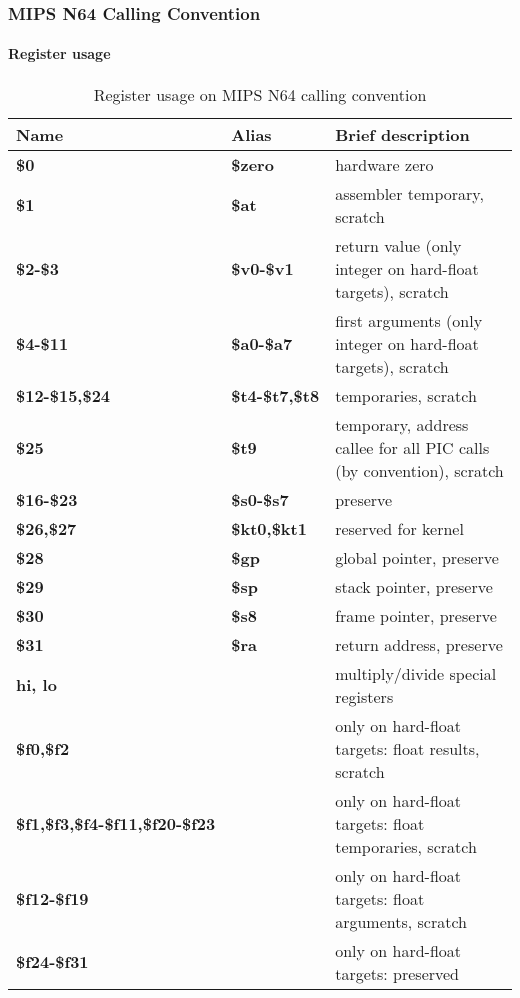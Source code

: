 \subsubsection{MIPS N64 Calling Convention}

\paragraph{Register usage}

\begin{table}[h]
\begin{tabular*}{0.95\textwidth}{lll}
Name                                   & Alias                & Brief description\\
\hline
{\bf \$0}                              & {\bf \$zero}         & hardware zero \\
{\bf \$1}                              & {\bf \$at}           & assembler temporary, scratch \\
{\bf \$2-\$3}                          & {\bf \$v0-\$v1}      & return value (only integer on hard-float targets), scratch \\
{\bf \$4-\$11}                         & {\bf \$a0-\$a7}      & first arguments (only integer on hard-float targets), scratch \\
{\bf \$12-\$15,\$24}                   & {\bf \$t4-\$t7,\$t8} & temporaries, scratch \\
{\bf \$25}                             & {\bf \$t9}           & temporary, address callee for all PIC calls (by convention), scratch \\
{\bf \$16-\$23}                        & {\bf \$s0-\$s7}      & preserve \\
{\bf \$26,\$27}                        & {\bf \$kt0,\$kt1}    & reserved for kernel \\
{\bf \$28}                             & {\bf \$gp}           & global pointer, preserve \\
{\bf \$29}                             & {\bf \$sp}           & stack pointer, preserve \\
{\bf \$30}                             & {\bf \$s8}           & frame pointer, preserve \\
{\bf \$31}                             & {\bf \$ra}           & return address, preserve \\
{\bf hi, lo}                           &                      & multiply/divide special registers \\
{\bf \$f0,\$f2}                        &                      & only on hard-float targets: float results, scratch \\
{\bf \$f1,\$f3,\$f4-\$f11,\$f20-\$f23} &                      & only on hard-float targets: float temporaries, scratch \\
{\bf \$f12-\$f19}                      &                      & only on hard-float targets: float arguments, scratch \\
{\bf \$f24-\$f31}                      &                      & only on hard-float targets: preserved \\%
\end{tabular*}
\caption{Register usage on MIPS N64 calling convention}
\end{table}

